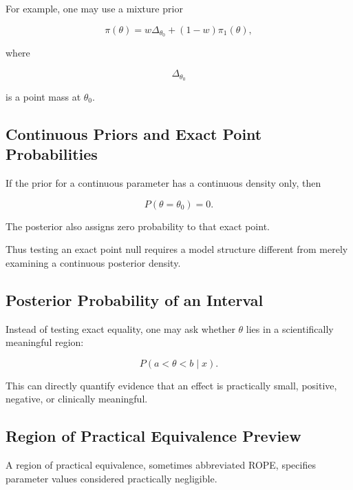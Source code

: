 For example, one may use a mixture prior

\[
\boxed{
\pi(\theta)
=
w\Delta_{\theta_0}
+
(1-w)\pi_1(\theta),
}
\]

where

\[
\Delta_{\theta_0}
\]

is a point mass at \(\theta_0\).

\subsection{Continuous Priors and Exact Point Probabilities}
\label{subsec:continuous-prior-point-null}

If the prior for a continuous parameter has a continuous density only,
then

\[
\boxed{
P(\theta=\theta_0)=0.
}
\]

The posterior also assigns zero probability to that exact point.

Thus testing an exact point null requires a model structure different
from merely examining a continuous posterior density.

\subsection{Posterior Probability of an Interval}
\label{subsec:posterior-probability-interval}

Instead of testing exact equality, one may ask whether \(\theta\) lies in
a scientifically meaningful region:

\[
\boxed{
P
(
a<\theta<b
\mid x
).
}
\]

This can directly quantify evidence that an effect is practically small,
positive, negative, or clinically meaningful.

\subsection{Region of Practical Equivalence Preview}
\label{subsec:rope-preview}

A region of practical equivalence, sometimes abbreviated ROPE, specifies
parameter values considered practically negligible.

